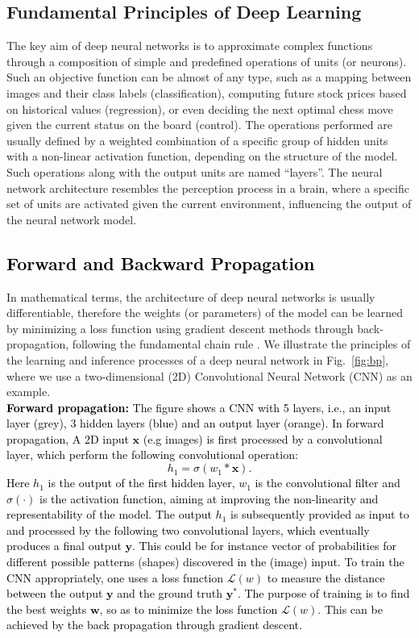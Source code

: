 \documentclass[journal,comsoc,letter]{IEEEtran}
\newcommand{\edit}[1]{\textcolor{black}{#1}}
\begin{document}
 \subsection{Fundamental Principles of Deep Learning}
The key aim of deep neural networks is to approximate complex functions through a composition of simple and predefined operations of units (or neurons). Such an objective function can be almost of any type, such as a mapping between images and their class labels (classification), computing future stock prices based on historical values (regression), or even deciding the next optimal chess move given the current status on the board (control). The operations performed are usually defined by a weighted combination of a specific group of hidden units with a non-linear activation function, depending on the structure of the model. Such operations along with the output units are named ``layers''. The neural network architecture resembles the perception process in a brain, where a specific set of units are activated given the current environment, influencing the output of the neural network model.

\subsection{\edit{Forward and Backward Propagation}}
In mathematical terms, the architecture of deep neural networks is usually differentiable, therefore the weights (or parameters) of the model can be learned by minimizing a loss function using gradient descent methods through back-propagation, following the fundamental chain rule \cite{williams1986learning}. We illustrate the principles of the learning and inference processes of a deep neural network in Fig.~\ref{fig:bp}, where we use a two-dimensional (2D) Convolutional Neural Network (CNN) as an example. \\

\noindent\edit{\textbf{Forward propagation:} The figure shows a CNN with 5 layers, i.e., an input layer (grey), 3 hidden layers (blue) and an output layer (orange). In forward propagation,  A 2D input $\mathbf{x}$ (e.g images) is first processed by a convolutional layer, which perform the following convolutional operation:
\begin{equation}
h_1 = \sigma(w_1\ast \mathbf{x}).
\end{equation}
Here $h_1$ is the output of the first hidden layer, $w_1$ is the convolutional filter and $\sigma(\cdot)$ is the activation function, aiming at improving the non-linearity and representability of the model. The output $h_1$ is subsequently provided as input to and processed by the following two convolutional layers, which eventually produces a final output $\mathbf{y}$. This could be for instance vector of probabilities for different possible patterns (shapes) discovered in the (image) input. To train the CNN appropriately, one uses a loss function $\mathcal{L}(w)$ to measure the distance between the output $\mathbf{y}$ and the ground truth $\mathbf{y^*}$. The purpose of training is to find the best weights $\mathbf{w}$, so as to minimize the loss function $\mathcal{L}(w)$. This can be achieved by the back propagation through gradient descent.}\\
\end{document}
